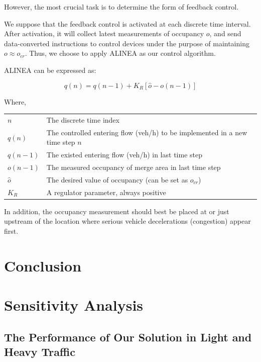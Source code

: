 \documentclass{mcmthesis}
\begin{document}
However, the most crucial task is to determine the
form of feedback control.


We suppose that the feedback control is activated
at each discrete time interval. After activation, it
will collect latest measurements of occupancy $o$, and
send data-converted instructions to control devices
under the purpose of maintaining $o  \approx  o_{cr}$.
Thus, we choose to apply ALINEA as our control algorithm.

ALINEA can be expressed as:

\[q\left( n \right) = q\left( {n - 1} \right) + {K_R}\left[ {\hat{o}  - o(n - 1)} \right]\]

Where,

\begin{table}[htbp]
  \centering
    \begin{tabular}{ll}
      \toprule
    $n$     & The discrete time index \\
    $q(n)$  & The controlled entering flow (veh/h) to be implemented in a new time step $n$ \\
    $q(n-1)$ & The existed entering flow (veh/h) in last time step \\
    $o(n-1)$ & The measured occupancy of merge area in last time step \\
    $\hat{o}$ & The desired value of occupancy (can be set as $o_{cr}$) \\
    $K_{R}$  & A regulator parameter, always positive \\
    \bottomrule
    \end{tabular}%
  \label{tab:addlabel}%
\end{table}%

In addition, the occupancy measurement should best be
placed at or just upstream of the location where serious
vehicle decelerations (congestion) appear first.

\section{Conclusion}

\section{Sensitivity Analysis}
\subsection{The Performance of Our Solution in Light
and Heavy Traffic}
\end{document}
